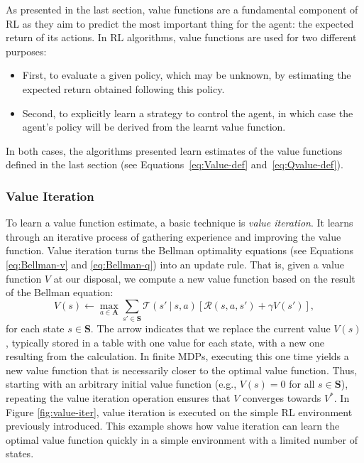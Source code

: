 As presented in the last section, value functions are a fundamental component of RL as they aim to predict the most important thing for the agent: the expected return of its actions. In RL algorithms, value functions are used for two different purposes:
\begin{itemize}
    \item First, to evaluate a given policy, which may be unknown, by estimating the expected return obtained following this policy. 
    \item Second, to explicitly learn a strategy to control the agent, in which case the agent's policy will be derived from the learnt value function. 
\end{itemize}
In both cases, the algorithms presented learn estimates of the value functions defined in the last section (see Equations~\ref{eq:Value-def} and~\ref{eq:Qvalue-def}). 


\subsubsection{Value Iteration}\label{sec:RL:ValueIter}

To learn a value function estimate, a basic technique is \textit{value iteration}. It learns through an iterative process of gathering experience and improving the value function. Value iteration turns the Bellman optimality equations (see Equations \ref{eq:Bellman-v} and \ref{eq:Bellman-q}) into an update rule. That is, given a value function $V$ at our disposal, we compute a new value function based on the result of the Bellman equation:
\begin{equation}
    V(s)\leftarrow\max_{a\in\mathbf{A}}\sum_{s'\in\mathbf{S}}\mathcal{T}(s'\ |\ s,a)\left[\mathcal{R}(s,a,s')+\gamma V(s')\right],
    \label{eq:Value-iter}
\end{equation}
for each state $s\in\mathbf{S}$. The arrow indicates that we replace the current value $V(s)$, typically stored in a table with one value for each state, with a new one resulting from the calculation. In finite MDPs, executing this one time yields a new value function that is necessarily closer to the optimal value function. Thus, starting with an arbitrary initial value function (e.g., $V(s)=0$ for all $s\in\mathbf{S}$), repeating the value iteration operation ensures that $V$ converges towards $V^*$. In Figure \ref{fig:value-iter}, value iteration is executed on the simple RL environment previously introduced. This example shows how value iteration can learn the optimal value function quickly in a simple environment with a limited number of states. 

